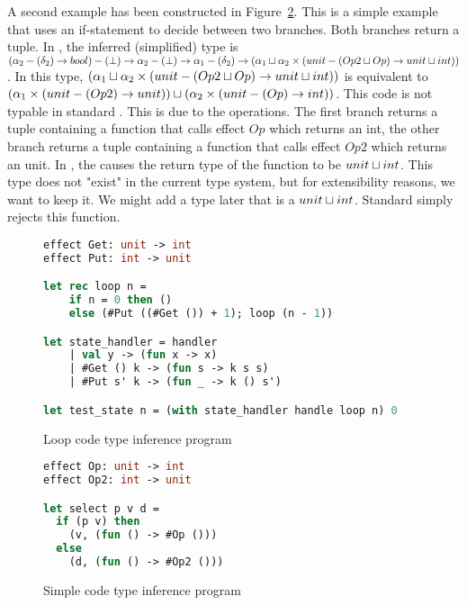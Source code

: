 A second example has been constructed in Figure~\ref{lst:simple}. This is a simple example that uses an if-statement to decide between two branches. Both branches return a tuple. In \core, the inferred (simplified) type is $(\alpha_2 -(\delta_2)\to bool) -(\bot)\to
\alpha_2 -(\bot)\to
\alpha_1 -(\delta_2)\to
(\alpha_1 \sqcup \alpha_2 \times (unit -(Op2 \sqcup Op)\to unit \sqcup int))$. In this type, $(\alpha_1 \sqcup \alpha_2 \times (unit -(Op2 \sqcup Op)\to unit \sqcup int))$ is equivalent to $(\alpha_1 \times (unit -(Op2)\to unit)) \sqcup (\alpha_2 \times (unit -(Op)\to int))$. This code is not typable in standard \eff. This is due to the operations. The first branch returns a tuple containing a function that calls effect $Op$ which returns an int, the other branch returns a tuple containing a function that calls effect $Op2$ which returns an unit. In \core, the causes the return type of the function to be $unit \sqcup int$. This type does not "exist" in the current type system, but for extensibility reasons, we want to keep it. We might add a type later that is a $unit \sqcup int$. Standard \eff simply rejects this function.

\begin{figure}[!htb]
\caption{Loop code type inference program}
\label{lst:range}
\begin{lstlisting}[language=Caml]
effect Get: unit -> int
effect Put: int -> unit

let rec loop n =
    if n = 0 then ()
    else (#Put ((#Get ()) + 1); loop (n - 1))

let state_handler = handler
    | val y -> (fun x -> x)
    | #Get () k -> (fun s -> k s s)
    | #Put s' k -> (fun _ -> k () s')

let test_state n = (with state_handler handle loop n) 0
\end{lstlisting}
\end{figure}

\begin{figure}[!htb]
\caption{Simple code type inference program}
\label{lst:simple}
\begin{lstlisting}[language=Caml]
effect Op: unit -> int
effect Op2: int -> unit

let select p v d = 
  if (p v) then 
    (v, (fun () -> #Op ()))
  else 
    (d, (fun () -> #Op2 ()))
\end{lstlisting}
\end{figure}

